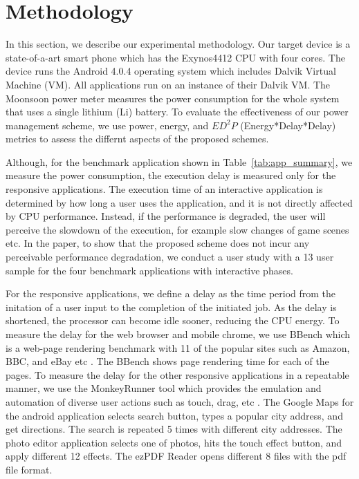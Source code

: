 \section{Methodology}
In this section, we describe our experimental methodology. 
Our target device is a state-of-a-art smart phone which has the Exynos4412 CPU with four cores.
The device runs the Android 4.0.4 operating system which includes Dalvik Virtual Machine (VM). 
All applications run on an instance of their Dalvik VM. 
The Moonsoon power meter measures the power consumption for the whole system that uses a single lithium (Li) battery. 
To evaluate the effectiveness of our power management scheme, we use power, energy, and $ED^2P$ (Energy*Delay*Delay) metrics to assess
the differnt aspects of the proposed schemes.

Although, for the benchmark application shown in Table~\ref{tab:app_summary}, we measure the power consumption, the execution
delay is measured only for the responsive applications. The execution time of an interactive application is determined by
how long a user uses the application, and it is not directly affected by CPU performance. Instead, if the performance
is degraded, the user will perceive the slowdown of the execution, for example slow changes of game scenes etc.
In the paper, to show that the proposed scheme does not incur any perceivable performance degradation, we 
conduct a user study with a 13 user sample for the four benchmark applications with interactive phases.

For the responsive applications, we define a delay as the time period from the initation of a user input to the completion
of the initiated job. As the delay is shortened, the processor can become idle sooner, reducing the CPU energy.
To measure the delay for the web browser and mobile chrome, 
we use BBench which is a web-page rendering benchmark with 11 of the popular sites such as Amazon, BBC, and eBay etc \cite{characterinteractive}. 
The BBench shows page rendering time for each of the pages. 
To measure the delay for the other responsive applications in a repeatable manner, we use the MonkeyRunner tool which 
provides the emulation and automation of diverse user actions such as touch, drag, etc \cite{monkeyrunner}.
The Google Maps for the android application selects search button, types a popular city address, and get directions. 
The search is repeated 5 times with different city addresses. 
The photo editor application selects one of photos, hits the touch effect button, and apply different 12 effects. 
The ezPDF Reader opens different 8 files with the pdf file format.

